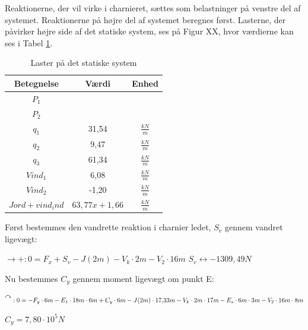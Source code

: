 Reaktionerne, der vil virke i charnieret, sættes som belastninger på venstre del af systemet. 
\newline
\newline
Reaktionerne på højre del af systemet beregnes først.
\newline
\newline
Lasterne, der påvirker højre side af det statiske system, ses på Figur XX, hvor værdierne kan ses i Tabel \ref{tab:laster}.

\begin{table}
	\begin{center}
		\begin{tabular}{|c|c|c|}
			\hline
Betegnelse     & Værdi & Enhed \\ \hline
$P_1$           &       &       \\ \hline
$P_2$           &       &       \\ \hline
$q_1$           & 31,54 & $\frac{kN}{m}$ \\ \hline
$q_2$           & 9,47  & $\frac{kN}{m}$ \\ \hline
$q_3$           & 61,34 & $\frac{kN}{m}$ \\ \hline
$Vind_1$        & 6,08  & $\frac{kN}{m}$ \\ \hline
$Vind_2$       	& -1,20 & $\frac{kN}{m}$ \\ \hline
$Jord+vind_ind$ & $63,\!77x + 1,\!66$ & $\frac{kN}{m}$ \\ \hline
		\end{tabular}
		\caption{Laster på det statiske system}
		\label{tab:laster}
	\end{center}
\end{table}

Først bestemmes den vandrette reaktion i charnier ledet, $S_v$ gennem vandret ligevægt: 
\begin{center}
	$\rightarrow+:0 = F_x + S_v - J(2m) - V_k \cdot 2m - V_2 \cdot 16m$
	$S_v \leftrightarrow -1309,\!49 N$
\end{center}

Nu bestemmes $C_y$ gennem moment ligevægt om punkt E: 
\begin{center}
	$\AR{}:0 = -F_y \cdot 6m - E_1 \cdot 18m \cdot 6m + C_y \cdot 6m - J(2m) \cdot 17,\!33m - V_k \cdot 2m \cdot 17m - E_s \cdot 6m \cdot 3m - V_2 \cdot 16m \cdot 8m$
\end{center}
\begin{center}
	$C_y = 7,\!80 \cdot 10^5 N$
\end{center}

